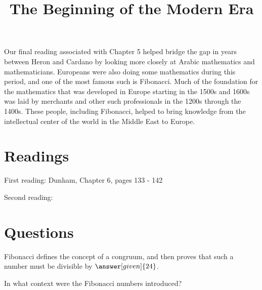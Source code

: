 \documentclass[nooutcomes]{ximera}
\title{The Beginning of the Modern Era}
\begin{document}
\begin{abstract}
    
\end{abstract}
\maketitle

Our final reading associated with Chapter 5 helped bridge the gap in years between Heron and Cardano by looking more closely at Arabic mathematics and mathematicians.  Europeans were also doing some mathematics during this period, and one of the most famous such is Fibonacci.  Much of the foundation for the mathematics that was developed in Europe starting in the 1500s and 1600s was laid by merchants and other such professionals in the 1200s through the 1400s.  These people, including Fibonacci, helped to bring knowledge from the intellectual center of the world in the Middle East to Europe.


\section{Readings}
First reading: Dunham, Chapter 6, pages 133 - 142

Second reading: 



\section{Questions}

\begin{question}
Fibonacci defines the concept of a congruum, and then proves that such a number must be divisible by $\answer[given]{24}$.
\end{question}

\begin{question}
In what context were the Fibonacci numbers introduced?
\begin{multipleChoice}
\end{multipleChoice}
\end{question}


%
\end{document}
